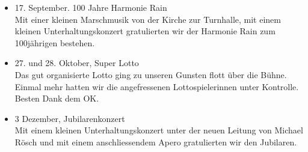 \begin{history}
\begin{itemize}
        \item 17. September. 100 Jahre Harmonie Rain\\
              Mit einer kleinen Marschmusik von der Kirche zur Turnhalle, mit einem
              kleinen Unterhaltungskonzert gratulierten wir der Harmonie Rain zum
              100jährigen bestehen.

        \item 27. und 28. Oktober, Super Lotto\\
              Das gut organisierte Lotto ging zu unseren Gunsten flott über die Bühne.
              Einmal mehr hatten wir die angefressenen Lottospielerinnen unter
              Kontrolle. Besten Dank dem OK.

        \item 3 Dezember, Jubilarenkonzert\\
              Mit einem kleinen Unterhaltungskonzert unter der neuen Leitung von
              Michael Rösch und mit einem anschliessendem Apero gratulierten wir den
              Jubilaren.

    \end{itemize}

\end{history}
